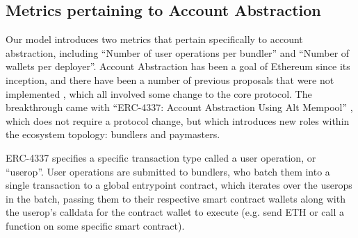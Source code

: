 \documentclass[conference]{IEEEtran}
\begin{document}
\subsection{Metrics pertaining to Account Abstraction}

Our model introduces two metrics that pertain specifically to account abstraction, including ``Number of user operations per bundler'' and ``Number of wallets per deployer''. Account Abstraction has been a goal of Ethereum since its inception, and there have been a number of previous proposals that were not implemented \cite{john2023, wilson2020, dietrichs2020}, which all involved some change to the core protocol.  The breakthrough came with ``ERC-4337: Account Abstraction Using Alt Mempool'' \cite{buterin2021B}, which does not require a protocol change, but which introduces new roles within the ecosystem topology: bundlers and paymasters.

ERC-4337 specifies a specific transaction type called a user operation, or ``userop''.  User operations are submitted to bundlers, who batch them into a single transaction to a global entrypoint contract, which iterates over the userops in the batch, passing them to their respective smart contract wallets along with the userop's calldata for the contract wallet to execute (e.g. send ETH or call a function on some specific smart contract).
\end{document}
